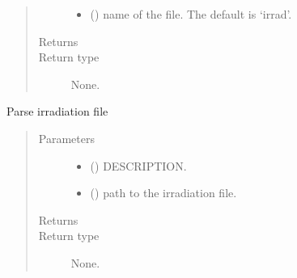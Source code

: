 \documentclass[letterpaper,10pt,english]{sphinxmanual}
\begin{document}
\begin{fulllineitems}
\begin{quote}
\begin{description}
\begin{itemize}
\item {} 
\sphinxAtStartPar
{} (\sphinxstyleliteralemphasis{\sphinxupquote{, }}) \textendash{} name of the file. The default is ‘irrad’.

\end{itemize}

\item[{Returns}] \leavevmode
\sphinxAtStartPar


\item[{Return type}] \leavevmode
\sphinxAtStartPar
None.

\end{description}\end{quote}

\begin{fulllineitems}
\label{\detokenize{api/inputgeneration:parsersD1S.IrradiationFile.from_text}}
\sphinxAtStartPar
Parse irradiation file
\begin{quote}\begin{description}
\item[{Parameters}] \leavevmode\begin{itemize}
\item {} 
\sphinxAtStartPar
{} () \textendash{} DESCRIPTION.

\item {} 
\sphinxAtStartPar
{} () \textendash{} path to the irradiation file.

\end{itemize}

\item[{Returns}] \leavevmode
\sphinxAtStartPar


\item[{Return type}] \leavevmode
\sphinxAtStartPar
None.

\end{description}\end{quote}


\end{fulllineitems}
\end{fulllineitems}
\end{document}
